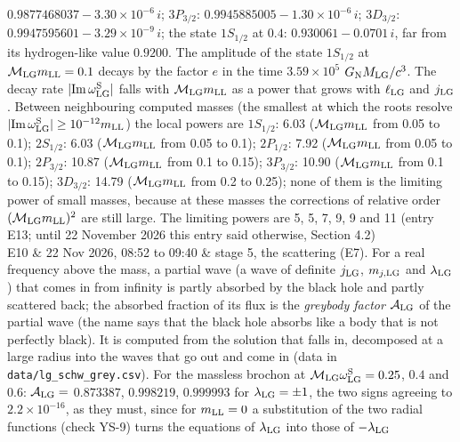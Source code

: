 \documentclass[
  10pt,
]{article}
\begin{document}
\begin{longtable}[]
\(0.9877468037-3.30\times10^{-6}\,i\); \(3P_{3/2}\):
\(0.9945885005-1.30\times10^{-6}\,i\); \(3D_{3/2}\):
\(0.9947595601-3.29\times10^{-9}\,i\); the state \(1S_{1/2}\) at
\(0.4\): \(0.930061-0.0701\,i\), far from its hydrogen-like value
\(0.9200\). The amplitude of the state \(1S_{1/2}\) at
\(\mathcal M_{\rm LG}m_{\rm LL}=0.1\) decays by the factor \(e\) in the
time \(3.59\times10^{5}\) \(G_{\rm N}M_{\rm LG}/c^3\). The decay rate
\(\lvert{\rm Im}\,\omega^{\rm S}_{\rm LG}\rvert\) falls with
\(\mathcal M_{\rm LG}m_{\rm LL}\) as a power that grows with
\(\ell_{\rm LG}\) and \(j_{\rm LG}\). Between neighbouring computed
masses (the smallest at which the roots resolve
\(\lvert{\rm Im}\,\omega^{\rm S}_{\rm LG}\rvert\ge10^{-12}m_{\rm LL}\))
the local powers are \(1S_{1/2}\): 6.03
(\(\mathcal M_{\rm LG}m_{\rm LL}\) from 0.05 to 0.1); \(2S_{1/2}\): 6.03
(\(\mathcal M_{\rm LG}m_{\rm LL}\) from 0.05 to 0.1); \(2P_{1/2}\): 7.92
(\(\mathcal M_{\rm LG}m_{\rm LL}\) from 0.05 to 0.1); \(2P_{3/2}\):
10.87 (\(\mathcal M_{\rm LG}m_{\rm LL}\) from 0.1 to 0.15);
\(3P_{3/2}\): 10.90 (\(\mathcal M_{\rm LG}m_{\rm LL}\) from 0.1 to
0.15); \(3D_{3/2}\): 14.79 (\(\mathcal M_{\rm LG}m_{\rm LL}\) from 0.2
to 0.25); none of them is the limiting power of small masses, because at
these masses the corrections of relative order
\((\mathcal M_{\rm LG}m_{\rm LL})^2\) are still large. The limiting
powers are 5, 5, 7, 9, 9 and 11 (entry E13; until 22 November 2026 this
entry said otherwise, Section 4.2) \\
E10 & 22 Nov 2026, 08:52 to 09:40 & stage 5, the scattering (E7). For a
real frequency above the mass, a partial wave (a wave of definite
\(j_{\rm LG}\), \(m_{j,{\rm LG}}\) and \(\lambda_{\rm LG}\)) that comes
in from infinity is partly absorbed by the black hole and partly
scattered back; the absorbed fraction of its flux is the \emph{greybody
factor} \(\mathcal A_{\rm LG}\) of the partial wave (the name says that
the black hole absorbs like a body that is not perfectly black). It is
computed from the solution that falls in, decomposed at a large radius
into the waves that go out and come in (data in
\texttt{data/lg\_schw\_grey.csv}). For the massless brochon at
\(\mathcal M_{\rm LG}\omega^{\rm S}_{\rm LG}=0.25\), \(0.4\) and
\(0.6\): \(\mathcal A_{\rm LG}=\) \(0.873387\), \(0.998219\),
\(0.999993\) for \(\lambda_{\rm LG}=\pm1\), the two signs agreeing to
\(2.2\times10^{-16}\), as they must, since for \(m_{\rm LL}=0\) a
substitution of the two radial functions (check YS-9) turns the
equations of \(\lambda_{\rm LG}\) into those of \(-\lambda_{\rm LG}\)

\end{longtable}
\end{document}
